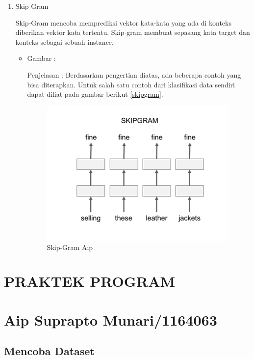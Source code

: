 \begin{enumerate}
\item Skip Gram
\par Skip-Gram mencoba memprediksi vektor kata-kata yang ada di konteks diberikan vektor kata tertentu. Skip-gram membuat sepasang kata target dan konteks sebagai sebuah instance.
\par
\begin{itemize}
\item Gambar :
\par Penjelasan : Berdasarkan pengertian diatas, ada beberapa contoh yang bisa diterapkan. Untuk salah satu contoh dari klasifikasi data sendiri dapat diliat pada gambar berikut \ref{skipgram}.
\begin{figure}[ht]
\centering
\includegraphics[scale=0.2]{figures/AIP/d6.PNG}
\caption{Skip-Gram Aip}
\label{text-Aip}
\end{figure}
\end{itemize}
\end{enumerate}


\section{PRAKTEK PROGRAM}
\section{Aip Suprapto Munari/1164063}
\subsection{Mencoba Dataset}
